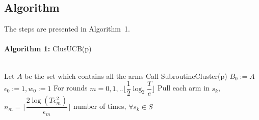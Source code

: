 \subsection*{Algorithm}

The steps are presented in Algorithm~1.\\%
\noindent\makebox[\linewidth]{\rule{\textwidth}{0.8pt}}\\[-0.1cm]
\textbf{Algorithm 1:} ClusUCB(p)\\[-0.3cm]
\noindent\makebox[\linewidth]{\rule{\textwidth}{0.4pt}}\\[-0.3cm]
\begin{algorithmic}[1]
\State Let $A$ be the set which contains all the arms
\State Call SubroutineCluster(p)
\State $B_{0}:=A$
\State $ \epsilon_{0}:=1, w_{0}:=1$
\State For rounds $m=0,1,..\big \lfloor \dfrac{1}{2}\log_{2} \dfrac{T}{e}\big\rfloor$
\State \hspace*{2em} Pull each arm in $s_{k}$, \newline\hspace*{2em}$n_{m}=\bigg\lceil\dfrac{2\log{(T\epsilon_{m}^{2})}}{\epsilon_{m}}\bigg\rceil$ number of times, $\forall s_{k}\in S$ 

\end{algorithmic}
